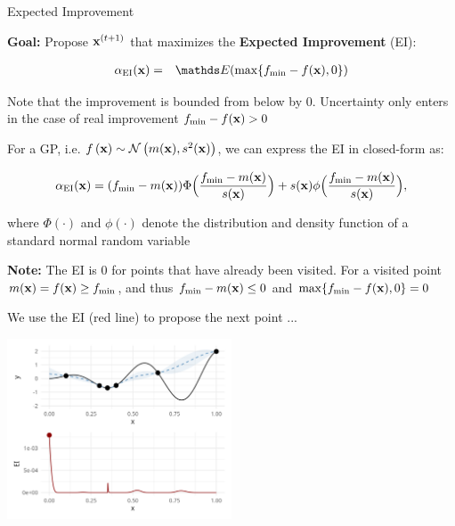 \documentclass[11pt,compress,t,notes=noshow, xcolor=table]{beamer}
\begin{document}
\begin{vbframe}{Expected Improvement}

\textbf{Goal:} Propose $\mathbf{x}^{(t+1)}$ that maximizes the \textbf{Expected Improvement} (EI): 

\vspace*{-0.5cm}

\begin{eqnarray*}
  \alpha_{\text{EI}}(\xv) &=& \E(\max\{f_{\min} - f(\xv), 0\}) \\
\end{eqnarray*} 

\vspace*{-0.5cm}

Note that the improvement is bounded from below by $0$. Uncertainty only enters in the case of real improvement $f_{\min} - f(\mathbf{x}) > 0$

\framebreak

For a GP, i.e. $f\left(\mathbf{x}\right) \sim \mathcal{N}\left(m(\mathbf{x}), s^2(\mathbf{x})\right)$, we can express the EI in closed-form as: 

$$
\alpha_{\text{EI}}(\mathbf{x}) = (f_{\min}-{m}(\mathbf{x})) \Phi \Big(\frac{f_{\min} - {m}(\mathbf{x})}{{s}(\mathbf{x})}\Big) + {s}(\mathbf{x}) \phi\Big(\frac{f_{\min}-{m}(\mathbf{x})}{{s}(\mathbf{x})}\Big), 
$$

where $\Phi(\cdot)$ and $\phi(\cdot)$ denote the distribution and density function of a standard normal random variable

\vfill

\begin{footnotesize}

\textbf{Note:} The EI is $0$ for points that have already been visited. For a visited point $m(\mathbf{x}) = f(\mathbf{x}) \ge f_{\min}$, and thus $f_{\min} - m(\mathbf{x}) \le 0$ and $\max\{f_{\min} - f(\mathbf{x}), 0\} = 0$

\end{footnotesize}

\framebreak

We use the EI (red line) to propose the next point ...

\begin{center}
  \includegraphics[width = 0.5\textwidth]{figure_man/bayesian_loop_4.png}
\end{center}


\end{vbframe}
\end{document}
